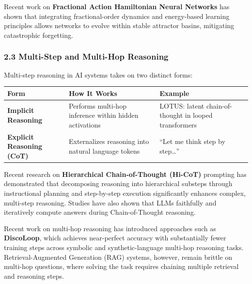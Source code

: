 \documentclass[
  11pt,
  a4paper,
]{article}
\begin{document}
Recent work on \textbf{Fractional Action Hamiltonian Neural Networks}
has shown that integrating fractional-order dynamics and energy-based
learning principles allows networks to evolve within stable attractor
basins, mitigating catastrophic forgetting.

\subsubsection{2.3 Multi-Step and Multi-Hop
Reasoning}\label{multi-step-and-multi-hop-reasoning}

Multi-step reasoning in AI systems takes on two distinct forms:

\begin{longtable}[]{@{}
  >{\raggedright\arraybackslash}p{}
  >{\raggedright\arraybackslash}p{}
  >{\raggedright\arraybackslash}p{}@{}}
\toprule\noalign{}
\begin{minipage}[b]{\linewidth}\raggedright
Form
\end{minipage} & \begin{minipage}[b]{\linewidth}\raggedright
How It Works
\end{minipage} & \begin{minipage}[b]{\linewidth}\raggedright
Example
\end{minipage} \\
\midrule\noalign{}
\endhead
\bottomrule\noalign{}
\endlastfoot
\textbf{Implicit Reasoning} & Performs multi-hop inference within hidden
activations & LOTUS: latent chain-of-thought in looped transformers \\
\textbf{Explicit Reasoning (CoT)} & Externalizes reasoning into natural
language tokens & ``Let me think step by step\ldots{}'' \\
\end{longtable}

Recent research on \textbf{Hierarchical Chain-of-Thought (Hi-CoT)}
prompting has demonstrated that decomposing reasoning into hierarchical
substeps through instructional planning and step-by-step execution
significantly enhances complex, multi-step reasoning. Studies have also
shown that LLMs faithfully and iteratively compute answers during
Chain-of-Thought reasoning.

Recent work on multi-hop reasoning has introduced approaches such as
\textbf{DiscoLoop}, which achieves near-perfect accuracy with
substantially fewer training steps across symbolic and
synthetic-language multi-hop reasoning tasks. Retrieval-Augmented
Generation (RAG) systems, however, remain brittle on multi-hop
questions, where solving the task requires chaining multiple retrieval
and reasoning steps.
\end{document}
